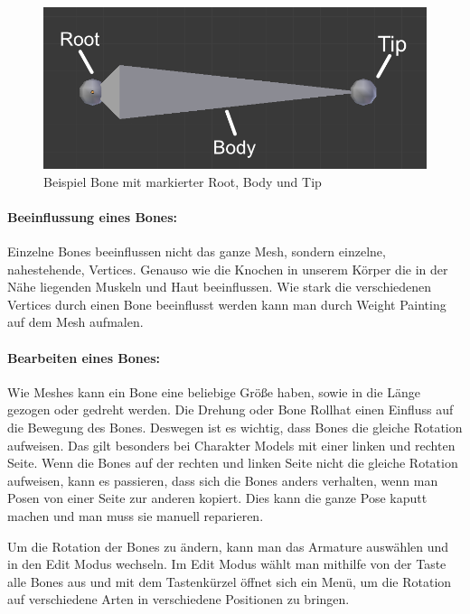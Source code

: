 \begin{figure}[H]
    \centering

    \includegraphics[width=.8\textwidth]{images/rigging_bone.png}
    \caption{Beispiel Bone mit markierter Root, Body und Tip}
\end{figure}

\paragraph{Beeinflussung eines Bones:}
Einzelne Bones beeinflussen nicht das ganze Mesh, sondern einzelne, nahestehende, Vertices. Genauso wie die Knochen in unserem Körper die in der Nähe liegenden Muskeln und Haut beeinflussen.
Wie stark die verschiedenen Vertices durch einen Bone beeinflusst werden kann man durch Weight Painting auf dem Mesh \dq aufmalen\dq.
\citep{Blender:Skinning}

\paragraph{Bearbeiten eines Bones:}
Wie Meshes kann ein Bone eine beliebige Größe haben, sowie in die Länge gezogen oder gedreht werden.
Die Drehung oder \dq Bone Roll\dq hat einen Einfluss auf die Bewegung des Bones. Deswegen ist es wichtig, dass Bones die gleiche Rotation aufweisen. Das gilt besonders bei Charakter Models mit einer linken und rechten Seite.
Wenn die Bones auf der rechten und linken Seite nicht die gleiche Rotation aufweisen, kann es passieren, dass sich die Bones anders verhalten, wenn man Posen von einer Seite zur anderen kopiert.
Dies kann die ganze Pose kaputt machen und man muss sie manuell reparieren.
\citep{Blender:boneRoll}

Um die Rotation der Bones zu ändern, kann man das Armature auswählen und in den Edit Modus wechseln.
Im Edit Modus wählt man mithilfe von der Taste  alle Bones aus und mit dem Tastenkürzel  öffnet sich ein Menü, um die Rotation auf
verschiedene Arten in verschiedene Positionen zu bringen.

